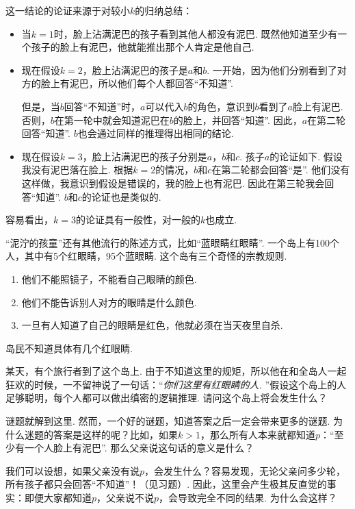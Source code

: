 这一结论的论证来源于对较小$k$的归纳总结：
\begin{itemize}
    \item 当$k=1$时，脸上沾满泥巴的孩子看到其他人都没有泥巴. 既然他知道至少有一个孩子的脸上有泥巴，他就能推出那个人肯定是他自己. 
    \item 现在假设$k=2$，脸上沾满泥巴的孩子是$a$和$b$. 一开始，因为他们分别看到了对方的脸上有泥巴，所以他们每个人都回答“不知道”. 
    
    但是，当$b$回答“不知道”时，$a$可以代入$b$的角色，意识到$b$看到了$a$脸上有泥巴. 否则，$b$在第一轮中就会知道泥巴在$b$的脸上，并回答“知道”. 因此，$a$在第二轮回答“知道”. $b$也会通过同样的推理得出相同的结论. 

    \item 现在假设$k=3$，脸上沾满泥巴的孩子分别是$a$，$b$和$c$. 孩子$a$的论证如下. 假设我没有泥巴落在脸上. 根据$k=2$的情况，$b$和$c$在第二轮都会回答“是”. 他们没有这样做，我意识到假设是错误的，我的脸上也有泥巴. 因此在第三轮我会回答“知道”. $b$和$c$的论证也是类似的.
\end{itemize}
容易看出，$k=3$的论证具有一般性，对一般的$k$也成立.

\begin{remark}
“泥泞的孩童”还有其他流行的陈述方式，比如“蓝眼睛红眼睛”. 一个岛上有100个人，其中有5个红眼睛，95个蓝眼睛. 这个岛有三个奇怪的宗教规则.
    \begin{enumerate}
        \item 他们不能照镜子，不能看自己眼睛的颜色. 
        \item 他们不能告诉别人对方的眼睛是什么颜色. 
        \item 一旦有人知道了自己的眼睛是红色，他就必须在当天夜里自杀.
    \end{enumerate}
岛民不知道具体有几个红眼睛. 

某天，有个旅行者到了这个岛上. 由于不知道这里的规矩，所以他在和全岛人一起狂欢的时候，一不留神说了一句话：“\emph{你们这里有红眼睛的人. }”假设这个岛上的人足够聪明，每个人都可以做出缜密的逻辑推理. 请问这个岛上将会发生什么？
\end{remark}

谜题就解到这里. 然而，一个好的谜题，知道答案之后一定会带来更多的谜题. 为什么迷题的答案是这样的呢？比如，如果$k>1$，那么所有人本来就都知道$p$：“至少有一个人脸上有泥巴”. 那么父亲说这句话的意义是什么？

我们可以设想，如果父亲没有说$p$，会发生什么？容易发现，无论父亲问多少轮，所有孩子都只会回答“不知道”！（见习题）. 因此，这里会产生极其反直觉的事实：即便大家都知道$p$，父亲说不说$p$，会导致完全不同的结果. 为什么会这样？

